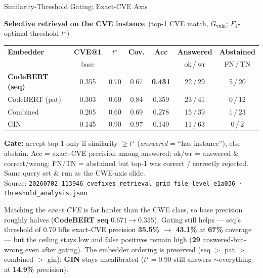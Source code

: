 \documentclass[aspectratio=169,10pt]{beamer}
\newcommand{\chit}[1]{\cellcolor{hit!30} #1}
\newcommand{\cmiss}[1]{\cellcolor{miss!25} #1}
\newcommand{\cwarn}[1]{\cellcolor{warn!30} #1}
\begin{document}
\begin{frame}{Similarity-Threshold Gating: Exact-CVE Axis}

  \begin{center}
    {\small\textbf{Selective retrieval on the CVE instance}\ {\scriptsize(top-1 CVE match, $G_{\mathrm{vuln}}$; $F_1$-optimal threshold $t^\star$)}}\\[4pt]
  {\scriptsize
  \renewcommand{\arraystretch}{1.3}
  \setlength{\tabcolsep}{4.5pt}
    \begin{tabular}{lcccccc}
      \toprule
      \textbf{Embedder} & \textbf{CVE@1} & \textbf{$t^\star$} & \textbf{Cov.} & \textbf{Acc} & \textbf{Answered} & \textbf{Abstained} \\
       & {\tiny base} & & & & {\tiny ok\,/\,wr} & {\tiny FN\,/\,TN} \\
      \midrule
      \rowcolor{hit!12}
      \textbf{CodeBERT (seq)} & 0.355 & 0.70 & 0.67 & \chit{\textbf{0.431}} & 22\,/\,29 & 5\,/\,20 \\
      CodeBERT (pat) & 0.303 & 0.60 & 0.84 & \cwarn{0.359} & 23\,/\,41 & 0\,/\,12 \\
      Combined & 0.205 & 0.60 & 0.69 & \cwarn{0.278} & 15\,/\,39 & 1\,/\,23 \\
      GIN & 0.145 & 0.90 & 0.97 & \cmiss{0.149} & 11\,/\,63 & 0\,/\,2 \\
      \bottomrule
    \end{tabular}}

  \vspace{0.25em}
  {\tiny\textcolor{notecol}{\textbf{Gate:} accept top-1 only if similarity $\geq t^\star$ (\emph{answered} = ``has instance''), else abstain. Acc = exact-CVE precision among answered; ok/wr = answered \& correct/wrong; FN/TN = abstained but top-1 was correct / correctly rejected. Same query set \& run as the CWE-axis slide.}}\\[2pt]
  {\tiny\textcolor{notecol}{Source: \texttt{20260702\_113946\_cvefixes\_retrieval\_grid\_file\_level\_e1a036} · \texttt{threshold\_analysis.json}}}
  \end{center}

  \vspace{0.3em}
  \begin{tcolorbox}[colback=warn!6, colframe=warn!70!black, boxrule=0.35pt,
    left=3pt, right=3pt, top=2pt, bottom=1pt, arc=2pt, width=\linewidth]
    \scriptsize
    Matching the \emph{exact CVE} is far harder than the CWE class, so base precision roughly halves (\textbf{CodeBERT seq} $0.671\!\to\!0.355$). Gating still helps --- seq's threshold of $0.70$ lifts exact-CVE precision \textbf{35.5\% $\to$ 43.1\%} at \textbf{67\%} coverage --- but the ceiling stays low and false positives remain high (\textbf{29} answered-but-wrong even after gating). The embedder ordering is preserved (seq $>$ pat $>$ combined $>$ gin); \textbf{GIN} stays \textcolor{miss}{uncalibrated} ($t^\star{=}0.90$ still answers $\sim$everything at \textbf{14.9\%} precision).
  \end{tcolorbox}

\end{frame}
\end{document}
